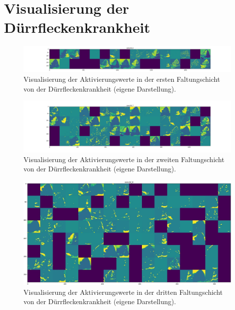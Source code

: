 \chapter{Visualisierung der Dürrfleckenkrankheit}
\label{anahngb}
\begin{figure}[h!]
	\centering
	\includegraphics[width=\textwidth]{visualisierungen/early/activation/early0.JPG}
	\caption{Visualisierung der Aktivierungswerte in der ersten Faltungschicht von der Dürrfleckenkrankheit (eigene Darstellung).}
	\label{}
\end{figure}

\begin{figure}[h!]
	\centering
	\includegraphics[width=\textwidth]{visualisierungen/early/activation/early3.JPG}
	\caption{Visualisierung der Aktivierungswerte in der zweiten Faltungschicht von der Dürrfleckenkrankheit (eigene Darstellung).}
	\label{}
\end{figure}

\begin{figure}[h!]
	\centering
	\includegraphics[width=\textwidth]{visualisierungen/early/activation/early6.JPG}
	\caption{Visualisierung der Aktivierungswerte in der dritten Faltungschicht von der Dürrfleckenkrankheit (eigene Darstellung).}
	\label{}
\end{figure}

